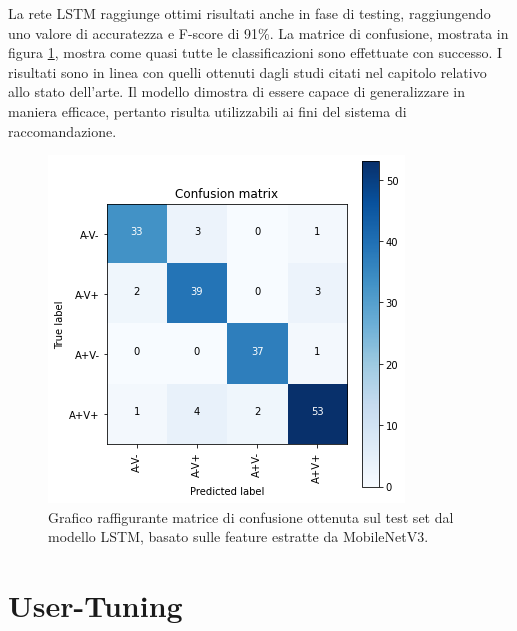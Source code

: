 \documentclass[11pt]{report}
\begin{document}
La rete LSTM raggiunge ottimi risultati anche in fase di testing, raggiungendo uno valore di accuratezza e F-score di 91\%. La matrice di confusione, mostrata in figura \ref{fig:LSTM-cm}, mostra come quasi tutte le classificazioni sono effettuate con successo. I risultati sono in linea con quelli ottenuti dagli studi citati nel capitolo relativo allo stato dell'arte. Il modello dimostra di essere capace di generalizzare in maniera efficace, pertanto risulta utilizzabili ai fini del sistema di raccomandazione.

\vspace{2cm}

\begin{figure}[h]
    \centering
    \includegraphics[scale=0.7]{img/confusion-matrix-lstm.png}
    \caption{Grafico raffigurante matrice di confusione ottenuta sul test set dal modello LSTM, basato sulle feature estratte da MobileNetV3.}
    \label{fig:LSTM-cm}
\end{figure}


\chapter{User-Tuning}
\end{document}
